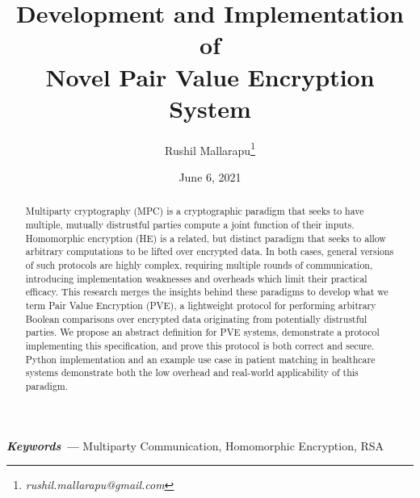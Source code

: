\documentclass{article}
\title{\vspace{-2cm}Development and Implementation of\\Novel Pair Value Encryption System}
\author{Rushil Mallarapu\footnote{\textit{rushil.mallarapu@gmail.com}}}
\date{\vspace{-0.25cm} June 6, 2021}
\providecommand{\keywords}[1]
{
  \small    
  \textbf{\textit{Keywords ---}} #1
}
\begin{document}
\maketitle

\vspace{-0.5cm}
\begin{abstract}
    Multiparty cryptography (MPC) is a cryptographic paradigm that seeks to have multiple, mutually distrustful parties compute a joint function of their inputs. Homomorphic encryption (HE) is a related, but distinct paradigm that seeks to allow arbitrary computations to be lifted over encrypted data. In both cases, general versions of such protocols are highly complex, requiring multiple rounds of communication, introducing implementation weaknesses and overheads which limit their practical efficacy. This research merges the insights behind these paradigms to develop what we term Pair Value Encryption (PVE), a lightweight protocol for performing arbitrary Boolean comparisons over encrypted data originating from potentially distrustful parties. We propose an abstract definition for PVE systems, demonstrate a protocol implementing this specification, and prove this protocol is both correct and secure. Python implementation and an example use case in patient matching in healthcare systems demonstrate both the low overhead and real-world applicability of this paradigm.
\end{abstract}

\keywords{Multiparty Communication, Homomorphic Encryption, RSA}
\end{document}
